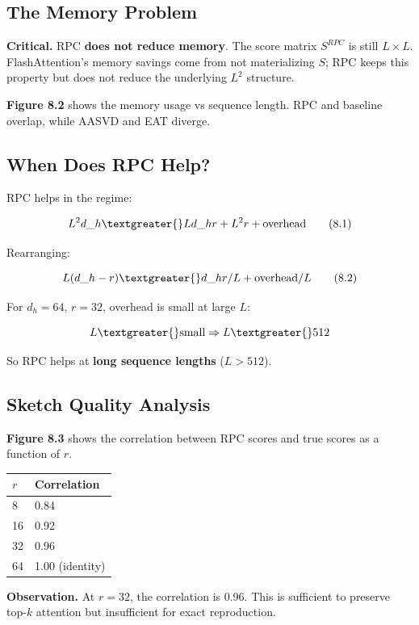 \subsection{The Memory Problem}

\textbf{Critical.} RPC \textbf{does not reduce memory}. The score matrix 
$S^{RPC}$ is still $L \times L$. FlashAttention's memory savings come from 
not materializing $S$; RPC keeps this property but does not reduce the 
underlying $L^2$ structure.

\textbf{Figure 8.2} shows the memory usage vs sequence length. RPC and baseline 
overlap, while AASVD and EAT diverge.

\subsection{When Does RPC Help?}

RPC helps in the regime:

\[
L^2 d\_h \textgreater{} L d\_h r + L^2 r + \text{overhead}
\tag{8.1}
\]

Rearranging:

\[
L (d\_h - r) \textgreater{} d\_h r / L + \text{overhead} / L
\tag{8.2}
\]

For $d_h = 64$, $r = 32$, overhead is small at large $L$:

\[
L \textgreater{} \text{small} \Rightarrow L \textgreater{} 512
\]

So RPC helps at \textbf{long sequence lengths} ($L > 512$).

\subsection{Sketch Quality Analysis}

\textbf{Figure 8.3} shows the correlation between RPC scores and true scores as 
a function of $r$.

\begin{table}[H]
\centering
\small
\begin{tabular}{ll}
\toprule
\textbf{$r$} & \textbf{Correlation} \\
\midrule
8 & 0.84 \\
16 & 0.92 \\
32 & 0.96 \\
64 & 1.00 (identity) \\
\bottomrule
\end{tabular}
\end{table}

\textbf{Observation.} At $r = 32$, the correlation is 0.96. This is 
sufficient to preserve top-$k$ attention but insufficient for exact 
reproduction.

